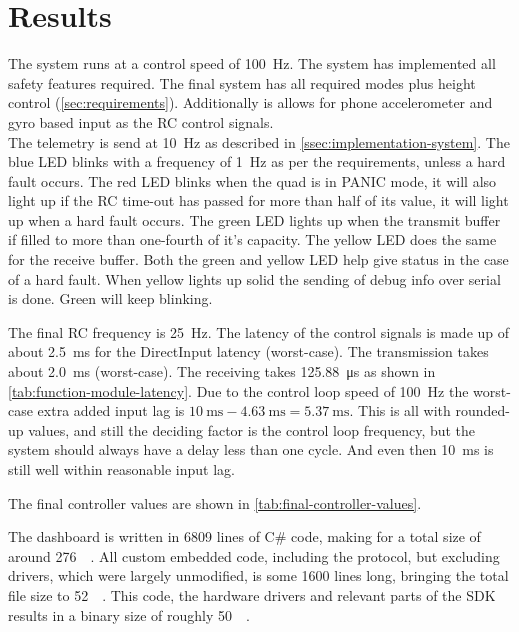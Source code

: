 \documentclass[final]{article}
\begin{document}
\section{Results}
The system runs at a control speed of \SI{100}{\hertz}.
The system has implemented all safety features required.
The final system has all required modes plus height control (\cref{sec:requirements}).
Additionally is allows for phone accelerometer and gyro based input as the RC control signals.\\
The telemetry is send at \SI{10}{\hertz} as described in \cref{ssec:implementation-system}.
The blue LED blinks with a frequency of \SI{1}{\hertz} as per the requirements, unless a hard fault occurs.
The red LED blinks when the quad is in PANIC mode, it will also light up if the RC time-out has passed for more than half of its value, it will light up when a hard fault occurs.
The green LED lights up when the transmit buffer if filled to more than one-fourth of it's capacity.
The yellow LED does the same for the receive buffer.
Both the green and yellow LED help give status in the case of a hard fault.
When yellow lights up solid the sending of debug info over serial is done.
Green will keep blinking.

The final RC frequency is \SI{25}{\hertz}.
The latency of the control signals is made up of about \SI{2.5}{\milli\second} for the DirectInput latency (worst-case).
The transmission takes about \SI{2.0}{\milli\second} (worst-case).
The receiving takes \SI{125.88}{\micro\second} as shown in \cref{tab:function-module-latency}.
Due to the control loop speed of \SI{100}{\hertz} the worst-case extra added input lag is $\SI{10}{\milli\second} - \SI{4.63}{\milli\second} = \SI{5.37}{\milli\second}$.
This is all with rounded-up values, and still the deciding factor is the control loop frequency, but the system should always have a delay less than one cycle.
And even then \SI{10}{\milli\second} is still well within reasonable input lag.

The final controller values are shown in \cref{tab:final-controller-values}.

The dashboard is written in 6809 lines of C\# code, making for a total size of around \SI{276}{\kilo\byte}.
All custom embedded code, including the protocol, but excluding drivers, which were largely unmodified, is some 1600 lines long, bringing the total file size to \SI{52}{\kilo\byte}.
This code, the hardware drivers and relevant parts of the SDK results in a binary size of roughly \SI{50}{\kilo\byte}.
\end{document}
